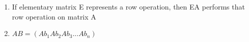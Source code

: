 \documentclass{article}
\begin{document}
\begin{enumerate}

\item If elementary matrix E represents a row operation, then EA performs 
that row operation on matrix A

\item $AB = (Ab_1 Ab_2 Ab_3 ... Ab_n)$
\end{enumerate}
\end{document}
